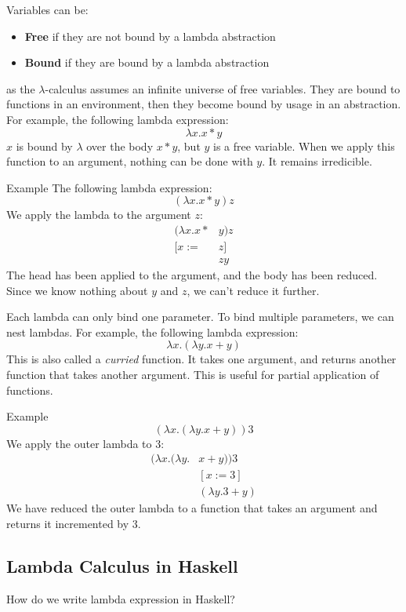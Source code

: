 \documentclass[a4paper]{article}
\begin{document}
Variables can be:

\begin{itemize}
    \item \textbf{Free} if they are not bound by a lambda abstraction
    \item \textbf{Bound} if they are bound by a lambda abstraction 
\end{itemize}
as the $\lambda$-calculus assumes an infinite universe of free variables. They are bound to functions in an environment, then they become 
bound by usage in an abstraction.
For example, the following lambda expression:
\[\lambda x . x*y\] 
$x$ is bound by $\lambda$ over the body $x * y$, but $y$ is a free variable. When we apply this function to an argument, nothing can be done with $y$. It remains irredicible.
\begin{examplebox}{Example}
    The following lambda expression:
    \[(\lambda x . x * y)z\]
    We apply the lambda to the argument $z$:
    \begin{align*}
        (\lambda x . x * &y)z\\
        [x := &z]\\
        &zy
    \end{align*}
    The head has been applied to the argument, and the body has been reduced. Since we know nothing about $y$ and $z$, we can't reduce it further.
\end{examplebox}
\noindent
Each lambda can only bind one parameter. To bind multiple parameters, we can nest lambdas. For example, the following lambda expression:
\[\lambda x . (\lambda y . x + y)\]
This is also called a \textit{curried} function. It takes one argument, and returns another function that takes another argument. This is useful for partial application of functions.
\begin{examplebox}{Example}
    \[(\lambda x . (\lambda y . x + y)) 3\]
    We apply the outer lambda to 3:
    \begin{align*}
        (\lambda x . (\lambda y . &x + y)) 3\\
        &[x := 3]\\
        &(\lambda y . 3 + y)
    \end{align*}
    We have reduced the outer lambda to a function that takes an argument and returns it incremented by 3.
\end{examplebox}
\subsection{Lambda Calculus in Haskell} 
How do we write lambda expression in Haskell?
\end{document}
